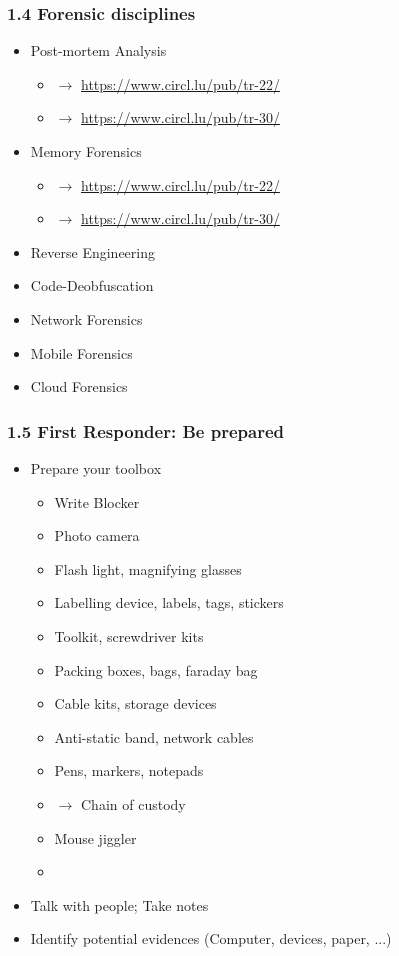 \begin{frame}
  \frametitle{1.4 Forensic disciplines}
  \begin{itemize}
      \item Post-mortem Analysis
        \begin{itemize}
            \item[] $\to$ \url{https://www.circl.lu/pub/tr-22/}
            \item[] $\to$ \url{https://www.circl.lu/pub/tr-30/}
        \end{itemize}
      \item Memory Forensics
        \begin{itemize}
            \item[] $\to$ \url{https://www.circl.lu/pub/tr-22/}
            \item[] $\to$ \url{https://www.circl.lu/pub/tr-30/}
        \end{itemize}
      \item Reverse Engineering
      \item Code-Deobfuscation
      \item Network Forensics
      \item Mobile Forensics
      \item Cloud Forensics
  \end{itemize}
\end{frame}


\begin{frame}
  \frametitle{1.5 First Responder: Be prepared}
  \begin{itemize}
      \item Prepare your toolbox
      \begin{itemize}
          \item Write Blocker
          \item Photo camera
          \item Flash light, magnifying glasses
          \item Labelling device, labels, tags, stickers
          \item Toolkit, screwdriver kits
          \item Packing boxes, bags, faraday bag
          \item Cable kits, storage devices
          \item Anti-static band, network cables
          \item Pens, markers, notepads
          \item[] $\to$ Chain of custody
          \item Mouse jiggler
	  \item[]
      \end{itemize}
      \item Talk with people; Take notes
      \item Identify potential evidences (Computer, devices, paper, ...)
  \end{itemize}
\end{frame}


